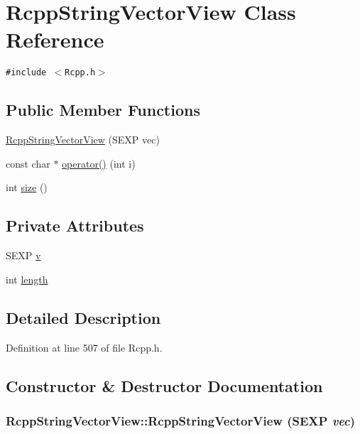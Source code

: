 \hypertarget{classRcppStringVectorView}{
\section{RcppStringVectorView Class Reference}
\label{classRcppStringVectorView}
}
{\tt \#include $<$Rcpp.h$>$}

\subsection*{Public Member Functions}
\begin{CompactItemize}
\item 
\hyperlink{classRcppStringVectorView_c74085bb16d7a13b58eb59f69268ec85}{RcppStringVectorView} (SEXP vec)
\item 
const char $\ast$ \hyperlink{classRcppStringVectorView_b81899b7d6c595f84d2fb07809ff002c}{operator()} (int i)
\item 
int \hyperlink{classRcppStringVectorView_df0f6b6541339ca747c4ed79c445869e}{size} ()
\end{CompactItemize}
\subsection*{Private Attributes}
\begin{CompactItemize}
\item 
SEXP \hyperlink{classRcppStringVectorView_1db3cc1a2dd1809151351c123343c15e}{v}
\item 
int \hyperlink{classRcppStringVectorView_ef6edaa52c234b4bb1fd1fc949fa0f25}{length}
\end{CompactItemize}


\subsection{Detailed Description}


Definition at line 507 of file Rcpp.h.

\subsection{Constructor \& Destructor Documentation}
\hypertarget{classRcppStringVectorView_c74085bb16d7a13b58eb59f69268ec85}{
\subsubsection[{RcppStringVectorView}]{\setlength{\rightskip}{0pt plus 5cm}RcppStringVectorView::RcppStringVectorView (SEXP {\em vec})}}
\label{classRcppStringVectorView_c74085bb16d7a13b58eb59f69268ec85}




